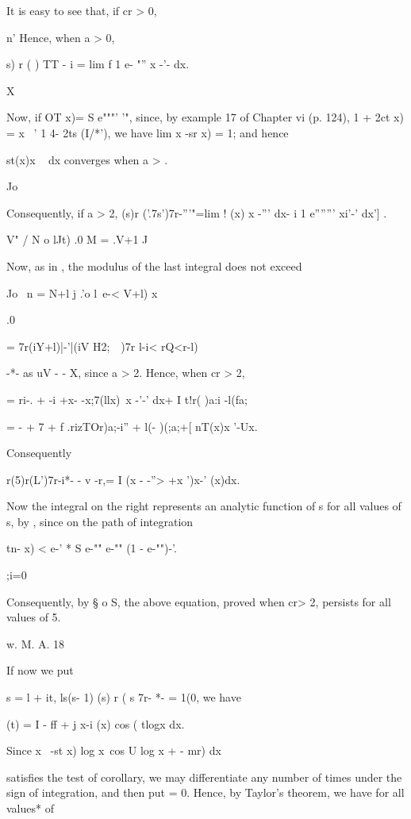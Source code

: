 %
%

It is easy to see that, if cr > 0,

n' Hence, when a > 0,

   s) r ( ) TT - i = lim f 1 e- "''  x -'- dx.

X

Now, if OT x)= S e"""' '", since, by example 17 of Chapter vi (p.
124), 1 + 2ct x) = x~ ' 1 4- 2ts (I/*'), we have lim x -sr x) = 1;
and hence

 st(x)x ~ dx converges when a > .

Jo

Consequently, if a > 2, (s)r ('.7s')7r-'''"=lim ! (x) x -''' dx- i 1
e''''''' xi'-' dx'] .

V" / N o lJt) .0 M = .V+1 J

Now, as in , the modulus of the last integral does not exceed

Jo \ n = N+l j .'o l\ e-< V+l) x

.0

= 7r(iY+l)|-'|(iV H2;\ \ )7r l-i< rQ<r-l)

-*- as uV - - X, since a > 2. Hence, when cr > 2,

= ri-. + -i +x- -x;7(llx)\ x -'-' dx+ I t!r( )a:i -l(fa;

= - + 7 + f .rizTOr)a;-i'' + l(- )(;a;+[ nT(x)x '-Ux.

Consequently

r(5)r(L')7r-i*- - v -r,= I (x - -''> +x ')x-' (x)dx.

Now the integral on the right represents an analytic function of s for
all values of s, by , since on the path of integration

tn- x) < e-' * S e-"" e-"" (1 - e-"")-'.

;i=0

Consequently, by § o S, the above equation, proved when cr> 2,
persists for all values of 5.

w. M. A.  18

%
%

If now we put

s = l + it, ls(s- 1) (s) r ( s 7r- *- = 1(0, we have

  (t) = I - ff + j x-i (x) cos ( tlogx dx.

Since x~ -st x) log x\ cos U log x + - mr) dx

satisfies the test of  corollary, we may differentiate any
number of times under the sign of integration, and then put = 0.
Hence, by Taylor's theorem, we have for all values* of

